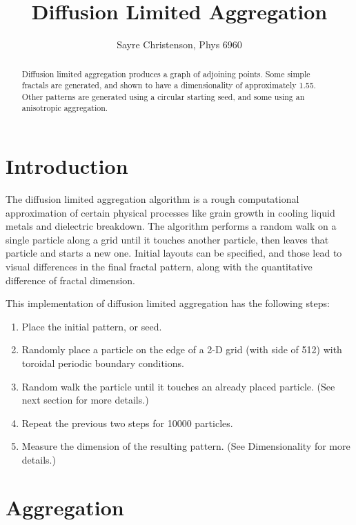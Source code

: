 \documentclass[12pt]{article}
\begin{document}
\title{Diffusion Limited Aggregation}
\date{}
\author{Sayre Christenson, Phys 6960}

\maketitle


\begin{abstract}

Diffusion limited aggregation produces a graph of adjoining points.
Some simple fractals are generated, and shown to have a dimensionality of approximately 1.55.
Other patterns are generated using a circular starting seed, and some using an anisotropic aggregation.

\end{abstract}

\section*{Introduction}

The diffusion limited aggregation algorithm is a rough computational approximation of certain physical processes like grain growth in cooling liquid metals and dielectric breakdown.
The algorithm performs a random walk on a single particle along a grid until it touches another particle, then leaves that particle and starts a new one.
Initial layouts can be specified, and those lead to visual differences in the final fractal pattern, along with the quantitative difference of fractal dimension.

This implementation of diffusion limited aggregation has the following steps:
\begin{enumerate}
\item{Place the initial pattern, or seed.}
\item{Randomly place a particle on the edge of a 2-D grid (with side of 512) with toroidal periodic boundary conditions.}
\item{Random walk the particle until it touches an already placed particle.  (See next section for more details.)}
\item{Repeat the previous two steps for 10000 particles.}
\item{Measure the dimension of the resulting pattern.  (See Dimensionality for more details.)}
\end{enumerate}


\section*{Aggregation}
\end{document}
